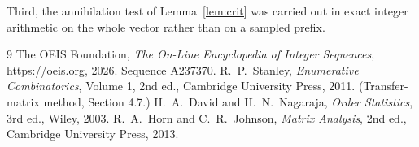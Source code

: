 \documentclass[11pt,a4paper]{article}
\theoremstyle{plain}
\theoremstyle{definition}
\begin{document}
Third, the annihilation test of Lemma~\ref{lem:crit} was carried out in exact integer
arithmetic on the whole vector rather than on a sampled prefix.

\begin{thebibliography}{9}
 The OEIS Foundation, \emph{The On-Line Encyclopedia of Integer
Sequences}, \url{https://oeis.org}, 2026. Sequence A237370.
 R.~P.~Stanley, \emph{Enumerative Combinatorics}, Volume 1, 2nd ed.,
Cambridge University Press, 2011. (Transfer-matrix method, Section 4.7.)
 H.~A.~David and H.~N.~Nagaraja, \emph{Order Statistics}, 3rd ed., Wiley,
2003.
 R.~A.~Horn and C.~R.~Johnson, \emph{Matrix Analysis}, 2nd ed., Cambridge
University Press, 2013.
\end{thebibliography}
\end{document}
